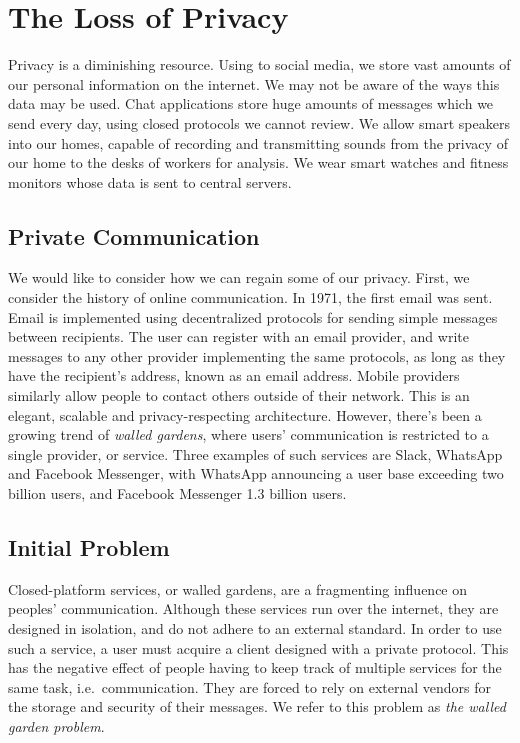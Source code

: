\chapter{The Loss of Privacy}
Privacy is a diminishing resource.
Using to social media, we store vast amounts of our personal information on the internet.
We may not be aware of the ways this data may be used.
Chat applications store huge amounts of messages which we send every day, using closed protocols we cannot review.
We allow smart speakers into our homes, capable of recording and transmitting sounds from the privacy of our home to the desks of workers for analysis.
We wear smart watches and fitness monitors whose data is sent to central servers.

\section{Private Communication}
We would like to consider how we can regain some of our privacy.
First, we consider the history of online communication.
In 1971, the first email was sent\cite{tomlinson2009first}.
Email is implemented using decentralized protocols for sending simple messages between recipients\cite{RFC5321}.
The user can register with an email provider, and write messages to any other provider implementing the same protocols, as long as they have the recipient's address, known as an email address.
Mobile providers similarly allow people to contact others outside of their network.
This is an elegant, scalable and privacy-respecting architecture.
However, there's been a growing trend of \textit{walled gardens}\cite{walled_gardens_gunnar_wolf_acm_2018}, where users' communication is restricted to a single provider, or service.
Three examples of such services are Slack, WhatsApp and Facebook Messenger, with WhatsApp announcing a user base exceeding two billion users, and Facebook Messenger 1.3 billion users\cite{walled_gardens_gunnar_wolf_acm_2018,whatsapp_2b_users_archive_org,messenger_1pt3b_users}.

\section{Initial Problem}\label{subsec:initial_problem_statement}
Closed-platform services, or walled gardens, are a fragmenting influence on peoples' communication.
Although these services run over the internet, they are designed in isolation, and do not adhere to an external standard.
In order to use such a service, a user must acquire a client designed with a private protocol.
This has the negative effect of people having to keep track of multiple services for the same task, i.e.~communication.
They are forced to rely on external vendors for the storage and security of their messages.
We refer to this problem as \textit{the walled garden problem}.

